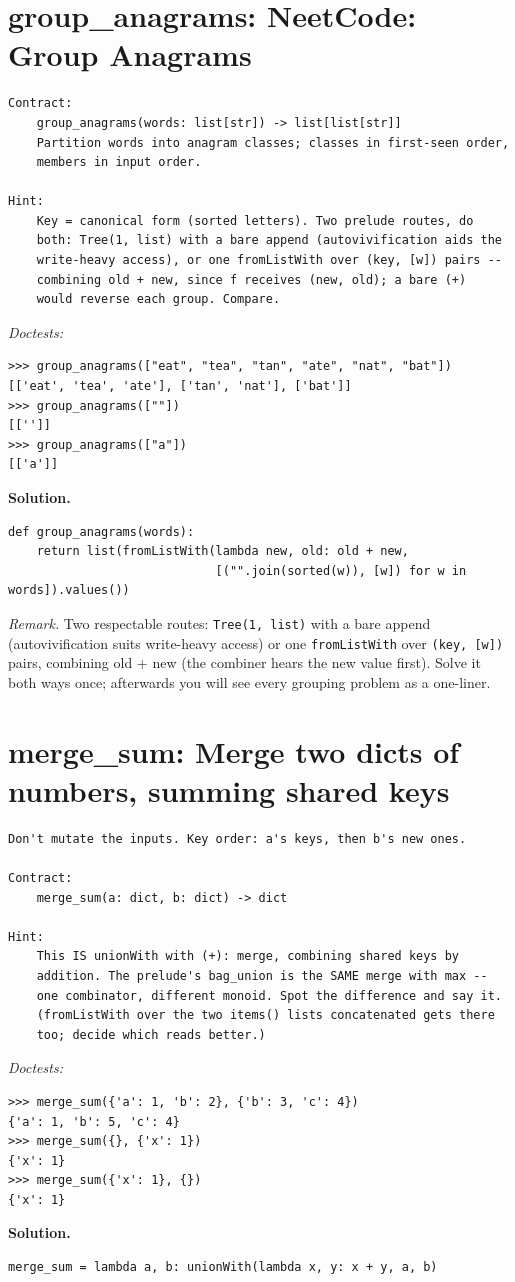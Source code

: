 \documentclass[11pt,letterpaper]{book}
\begin{document}
\section{group\_anagrams: NeetCode: Group Anagrams}
\begin{lstlisting}[style=spec]
Contract:
    group_anagrams(words: list[str]) -> list[list[str]]
    Partition words into anagram classes; classes in first-seen order,
    members in input order.

Hint:
    Key = canonical form (sorted letters). Two prelude routes, do
    both: Tree(1, list) with a bare append (autovivification aids the
    write-heavy access), or one fromListWith over (key, [w]) pairs --
    combining old + new, since f receives (new, old); a bare (+)
    would reverse each group. Compare.
\end{lstlisting}
\noindent\textit{Doctests:}
\begin{lstlisting}[style=spec]
>>> group_anagrams(["eat", "tea", "tan", "ate", "nat", "bat"])
[['eat', 'tea', 'ate'], ['tan', 'nat'], ['bat']]
>>> group_anagrams([""])
[['']]
>>> group_anagrams(["a"])
[['a']]
\end{lstlisting}
\noindent\textbf{Solution.}
\begin{lstlisting}[style=code]
def group_anagrams(words):
    return list(fromListWith(lambda new, old: old + new,
                             [("".join(sorted(w)), [w]) for w in words]).values())
\end{lstlisting}

\noindent\textit{Remark.} Two respectable routes: \texttt{Tree(1, list)} with a
bare append (autovivification suits write-heavy access) or one
\texttt{fromListWith} over \texttt{(key, [w])} pairs, combining old + new
(the combiner hears the new value first). Solve it both ways once; afterwards
you will see every grouping problem as a one-liner.

\section{merge\_sum: Merge two dicts of numbers, summing shared keys}
\begin{lstlisting}[style=spec]
Don't mutate the inputs. Key order: a's keys, then b's new ones.

Contract:
    merge_sum(a: dict, b: dict) -> dict

Hint:
    This IS unionWith with (+): merge, combining shared keys by
    addition. The prelude's bag_union is the SAME merge with max --
    one combinator, different monoid. Spot the difference and say it.
    (fromListWith over the two items() lists concatenated gets there
    too; decide which reads better.)
\end{lstlisting}
\noindent\textit{Doctests:}
\begin{lstlisting}[style=spec]
>>> merge_sum({'a': 1, 'b': 2}, {'b': 3, 'c': 4})
{'a': 1, 'b': 5, 'c': 4}
>>> merge_sum({}, {'x': 1})
{'x': 1}
>>> merge_sum({'x': 1}, {})
{'x': 1}
\end{lstlisting}
\noindent\textbf{Solution.}
\begin{lstlisting}[style=code]
merge_sum = lambda a, b: unionWith(lambda x, y: x + y, a, b)
\end{lstlisting}
\end{document}
